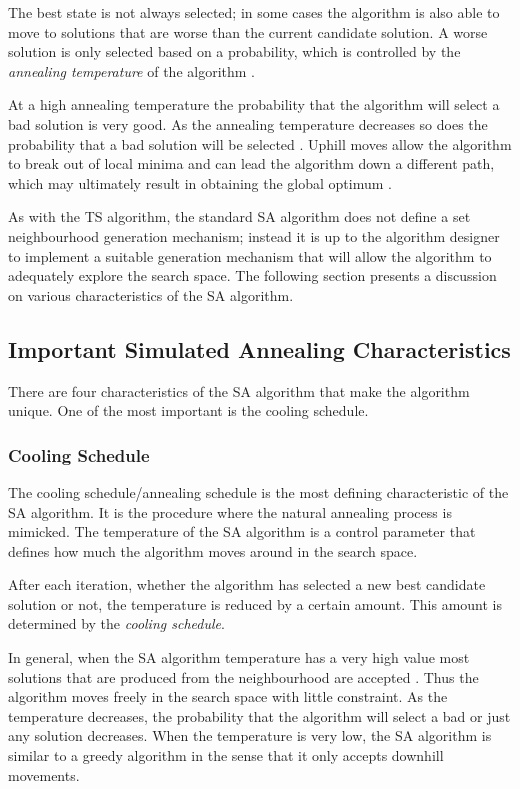 The best state is not always selected; in some cases the algorithm is also able to move to solutions that are worse than the current candidate solution. A worse solution is only selected based on a probability, which is controlled by the \emph{annealing temperature} of the algorithm \cite{TheoPraticalSA}. 

At a high annealing temperature the probability that the algorithm will select a bad solution is very good. As the annealing temperature decreases so does the probability that a bad solution will be selected \cite{CurveFittingSA}.  Uphill moves allow the algorithm to break out of local minima and can lead the algorithm down a different path, which may ultimately result in obtaining the global optimum \cite{SASingleMultiObj}. 

As with the \gls{TS} algorithm, the standard \gls{SA} algorithm does not define a set neighbourhood generation mechanism; instead it is up to the algorithm designer to implement a suitable generation mechanism that will allow the algorithm to adequately explore the search space\cite{VariousCoolingSA}. 
The following section presents a discussion on various characteristics of the \gls{SA} algorithm.
\subsection{Important Simulated Annealing Characteristics}
There are four characteristics of the \gls{SA} algorithm that make the algorithm unique. One of the most important is the cooling schedule. 

\subsubsection{Cooling Schedule}
The cooling schedule/annealing schedule is the most defining characteristic of the \gls{SA} algorithm. It is the procedure where the natural annealing process is mimicked. The temperature of the \gls{SA} algorithm is a control parameter that defines how much the algorithm moves around in the search space.

After each iteration, whether the algorithm has selected a new best candidate solution or not, the temperature is reduced by a certain amount. This amount is determined by the \emph{cooling schedule}.

In general, when the \gls{SA} algorithm temperature has a very high value most solutions that are produced from the neighbourhood are accepted \cite{ClusterSA}. Thus the algorithm moves freely in the search space with little constraint. As the temperature decreases, the probability that the algorithm will select a bad or just any solution decreases\cite{ClusterSA}. When the temperature is very low, the \gls{SA} algorithm is similar to a greedy algorithm in the sense that it only accepts downhill movements\cite{ClusterSA}.

